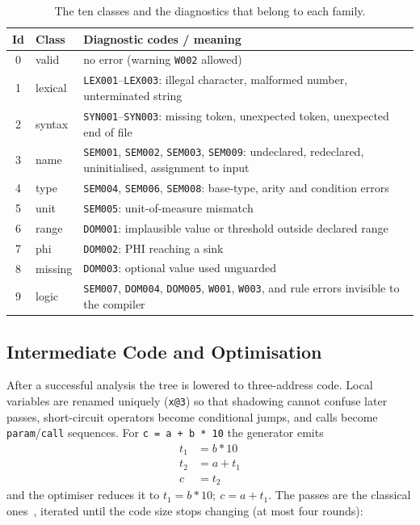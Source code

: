 \documentclass[conference]{IEEEtran}
\newcommand{\code}[1]{\texttt{#1}}
\begin{document}
\begin{table}[t]
\centering
\caption{The ten classes and the diagnostics that belong to each family.}
\label{tab:families}
\footnotesize
\begin{tabular}{clp{5.1cm}}
\toprule
\textbf{Id} & \textbf{Class} & \textbf{Diagnostic codes / meaning}\\
\midrule
0 & valid & no error (warning \code{W002} allowed)\\
1 & lexical & \code{LEX001}--\code{LEX003}: illegal character, malformed number, unterminated string\\
2 & syntax & \code{SYN001}--\code{SYN003}: missing token, unexpected token, unexpected end of file\\
3 & name & \code{SEM001}, \code{SEM002}, \code{SEM003}, \code{SEM009}: undeclared, redeclared, uninitialised, assignment to input\\
4 & type & \code{SEM004}, \code{SEM006}, \code{SEM008}: base-type, arity and condition errors\\
5 & unit & \code{SEM005}: unit-of-measure mismatch\\
6 & range & \code{DOM001}: implausible value or threshold outside declared range\\
7 & phi & \code{DOM002}: PHI reaching a sink\\
8 & missing & \code{DOM003}: optional value used unguarded\\
9 & logic & \code{SEM007}, \code{DOM004}, \code{DOM005}, \code{W001}, \code{W003}, and rule errors invisible to the compiler\\
\bottomrule
\end{tabular}
\end{table}

\subsection{Intermediate Code and Optimisation}

After a successful analysis the tree is lowered to three-address code. Local variables are renamed uniquely
(\code{x@3}) so that shadowing cannot confuse later passes, short-circuit operators become conditional jumps, and
calls become \code{param}/\code{call} sequences. For \code{c = a + b * 10} the generator emits
\begin{align}
t_1 &= b * 10\\
t_2 &= a + t_1\\
c &= t_2
\end{align}
and the optimiser reduces it to $t_1 = b*10;\ c = a + t_1$. The passes are the classical ones~\cite{muchnick1997,aho2006},
iterated until the code size stops changing (at most four rounds):
\end{document}
